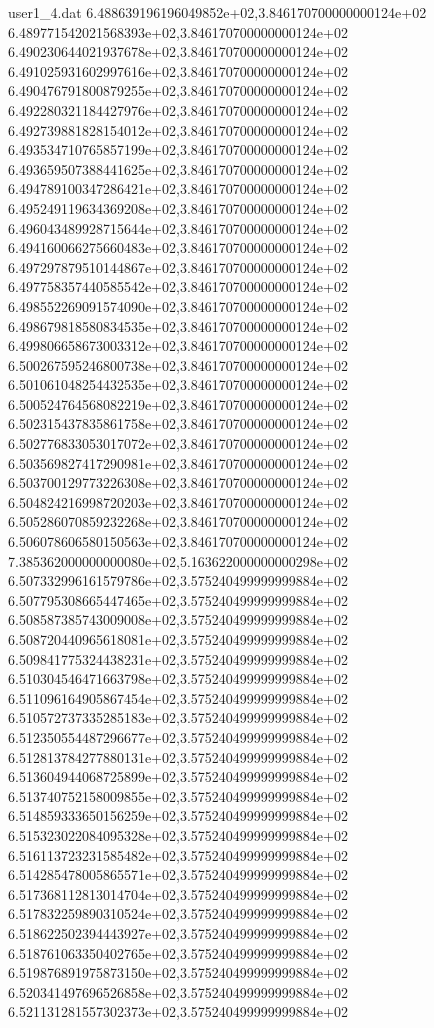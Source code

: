 \begin{filecontents}{user1_4.dat}
6.488639196196049852e+02,3.846170700000000124e+02
6.489771542021568393e+02,3.846170700000000124e+02
6.490230644021937678e+02,3.846170700000000124e+02
6.491025931602997616e+02,3.846170700000000124e+02
6.490476791800879255e+02,3.846170700000000124e+02
6.492280321184427976e+02,3.846170700000000124e+02
6.492739881828154012e+02,3.846170700000000124e+02
6.493534710765857199e+02,3.846170700000000124e+02
6.493659507388441625e+02,3.846170700000000124e+02
6.494789100347286421e+02,3.846170700000000124e+02
6.495249119634369208e+02,3.846170700000000124e+02
6.496043489928715644e+02,3.846170700000000124e+02
6.494160066275660483e+02,3.846170700000000124e+02
6.497297879510144867e+02,3.846170700000000124e+02
6.497758357440585542e+02,3.846170700000000124e+02
6.498552269091574090e+02,3.846170700000000124e+02
6.498679818580834535e+02,3.846170700000000124e+02
6.499806658673003312e+02,3.846170700000000124e+02
6.500267595246800738e+02,3.846170700000000124e+02
6.501061048254432535e+02,3.846170700000000124e+02
6.500524764568082219e+02,3.846170700000000124e+02
6.502315437835861758e+02,3.846170700000000124e+02
6.502776833053017072e+02,3.846170700000000124e+02
6.503569827417290981e+02,3.846170700000000124e+02
6.503700129773226308e+02,3.846170700000000124e+02
6.504824216998720203e+02,3.846170700000000124e+02
6.505286070859232268e+02,3.846170700000000124e+02
6.506078606580150563e+02,3.846170700000000124e+02
7.385362000000000080e+02,5.163622000000000298e+02
6.507332996161579786e+02,3.575240499999999884e+02
6.507795308665447465e+02,3.575240499999999884e+02
6.508587385743009008e+02,3.575240499999999884e+02
6.508720440965618081e+02,3.575240499999999884e+02
6.509841775324438231e+02,3.575240499999999884e+02
6.510304546471663798e+02,3.575240499999999884e+02
6.511096164905867454e+02,3.575240499999999884e+02
6.510572737335285183e+02,3.575240499999999884e+02
6.512350554487296677e+02,3.575240499999999884e+02
6.512813784277880131e+02,3.575240499999999884e+02
6.513604944068725899e+02,3.575240499999999884e+02
6.513740752158009855e+02,3.575240499999999884e+02
6.514859333650156259e+02,3.575240499999999884e+02
6.515323022084095328e+02,3.575240499999999884e+02
6.516113723231585482e+02,3.575240499999999884e+02
6.514285478005865571e+02,3.575240499999999884e+02
6.517368112813014704e+02,3.575240499999999884e+02
6.517832259890310524e+02,3.575240499999999884e+02
6.518622502394443927e+02,3.575240499999999884e+02
6.518761063350402765e+02,3.575240499999999884e+02
6.519876891975873150e+02,3.575240499999999884e+02
6.520341497696526858e+02,3.575240499999999884e+02
6.521131281557302373e+02,3.575240499999999884e+02

\end{filecontents}
